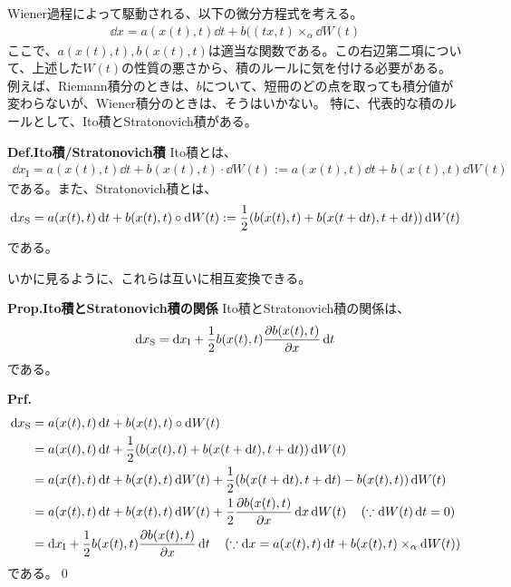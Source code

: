 \documentclass[a4paper,11pt]{jsarticle}
\numberwithin{equation}{section}
\begin{document}
Wiener過程によって駆動される、以下の微分方程式を考える。
\begin{align}
  \dd{x} = a(x(t),t)\dd{t} + b((tx,t)\times_{\alpha}\dd{W(t)}
\end{align}
ここで、$a(x(t),t), b(x(t),t)$は適当な関数である。この右辺第二項について、上述した$W(t)$の性質の悪さから、積のルールに気を付ける必要がある。例えば、Riemann積分のときは、$b$について、短冊のどの点を取っても積分値が変わらないが、Wiener積分のときは、そうはいかない。
特に、代表的な積のルールとして、Ito積とStratonovich積がある。\\

\begin{itembox}[l]{\textbf{Def.Ito積/Stratonovich積}}
  Ito積とは、
  \begin{align}
   \dd{x}_{\text{I}} = a(x(t),t) \dd{t} + b(x(t),t) \cdot \dd{W(t)} := a(x(t),t) \dd{t} + b(x(t),t)\dd{W(t)}
  \end{align}
  である。また、Stratonovich積とは、
  \begin{align}
    \dd{x}_{\text{S}} = a(x(t),t)\dd{t} + b(x(t),t) \circ \dd{W(t)} := \frac{1}{2}\qty(b(x(t),t) + b(x(t+\dd{t}),t + \dd{t}))\dd{W(t)}
  \end{align}
  である。
\end{itembox}

いかに見るように、これらは互いに相互変換できる。
\begin{itembox}[l]{\textbf{Prop.Ito積とStratonovich積の関係}}
  Ito積とStratonovich積の関係は、
  \begin{align}
    \dd{x}_{\text{S}} = \dd{x}_{\text{I}} + \frac{1}{2}b(x(t),t)\pdv{b(x(t),t)}{x}\dd{t}
  \end{align}
  である。
\end{itembox}
\textbf{Prf.}\\
\begin{align}
  \dd{x}_{\text{S}} &= a(x(t),t)\dd{t} + b(x(t),t) \circ \dd{W(t)}\\
  &= a(x(t),t)\dd{t} + \frac{1}{2}\qty(b(x(t),t) + b(x(t+\dd{t}),t + \dd{t}))\dd{W(t)}\\
  &= a(x(t),t)\dd{t} + b(x(t),t)\dd{W(t)} + \frac{1}{2}\qty(b(x(t+\dd{t}),t + \dd{t}) - b(x(t),t))\dd{W(t)}\\  
  &= a(x(t),t)\dd{t} + b(x(t),t)\dd{W(t)} + \frac{1}{2}\pdv{b(x(t),t)}{x}\dd{x}\dd{W(t)}\quad (\because \dd{W(t)}\dd{t} = 0)\\
  &= \dd{x}_{\text{I}} + \frac{1}{2}b(x(t),t)\pdv{b(x(t),t)}{x}\dd{t} \quad (\because \dd{x} = a(x(t),t)\dd{t} + b(x(t),t)\times_{\alpha} \dd{W(t)})
\end{align}
である。\qed\\
\end{document}
